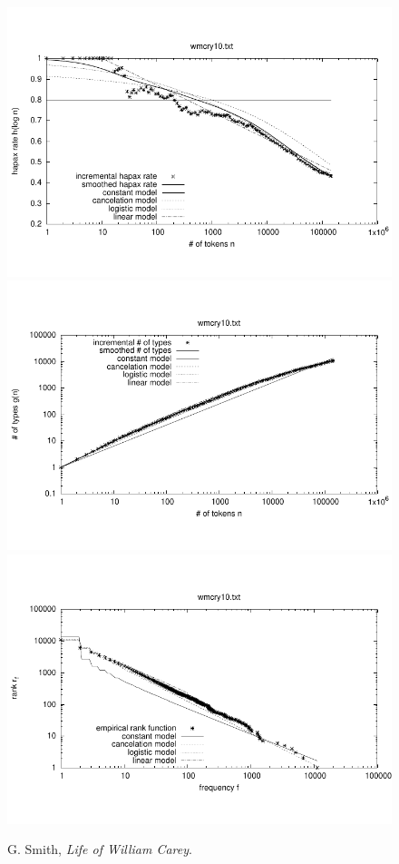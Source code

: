 \documentclass[a4paper,12pt]{article}
\begin{document}

\begin{figure}[p]
  \centering
  \vspace{-2em}
  \includegraphics[width=0.8\columnwidth]{output/herdan/wmcry10_27/token_ratio.pdf}
  \\[-3em]
  \includegraphics[width=0.8\columnwidth]{output/herdan/wmcry10_27/token_type.pdf}
  \\[-3em]
  \includegraphics[width=0.8\columnwidth]{output/herdan/wmcry10_27/frequency_rank.pdf}
  \vspace{-2em}
  \caption{G. Smith, \emph{Life of William Carey}.\label{figwmcry10F}}
\end{figure}
\end{document}
